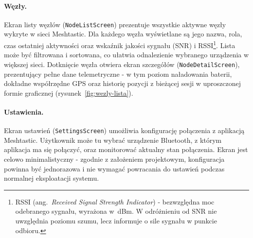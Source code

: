 \paragraph{Węzły.}

Ekran listy węzłów (\texttt{NodeListScreen}) prezentuje wszystkie aktywne węzły wykryte
w sieci Meshtastic. Dla każdego węzła wyświetlane są jego nazwa, rola, czas ostatniej
aktywności oraz wskaźnik jakości sygnału (SNR) i RSSI\footnote{RSSI (ang.\
\textit{Received Signal Strength Indicator}) - bezwzględna moc odebranego sygnału,
wyrażona w~dBm. W odróżnieniu od SNR nie uwzględnia poziomu szumu, lecz informuje
o sile sygnału w punkcie odbioru.}. Lista może być filtrowana i sortowana,
co ułatwia odnalezienie wybranego urządzenia w większej sieci. Dotknięcie węzła
otwiera ekran szczegółów (\texttt{NodeDetailScreen}), prezentujący pełne dane
telemetryczne - w tym poziom naładowania baterii, dokładne współrzędne GPS
oraz historię pozycji z bieżącej sesji w uproszczonej formie graficznej (rysunek~\ref{fig:wezly-lista}).

\paragraph{Ustawienia.}

Ekran ustawień (\texttt{SettingsScreen}) umożliwia konfigurację połączenia z aplikacją
Meshtastic. Użytkownik może tu wybrać urządzenie Bluetooth, z którym aplikacja ma się
połączyć, oraz monitorować aktualny stan połączenia. Ekran jest celowo minimalistyczny -
zgodnie z założeniem projektowym, konfiguracja powinna być jednorazowa i nie wymagać
powracania do ustawień podczas normalnej eksploatacji systemu.
